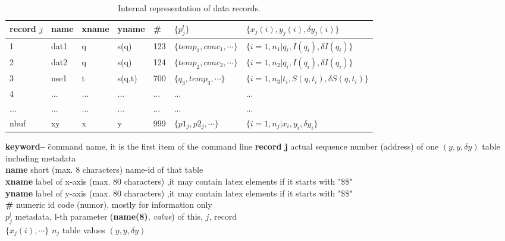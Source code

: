\documentclass[11pt,fleqn]{book} %
\begin{document}
\noindent
\begin{table}[h!]
\footnotesize
    \begin{tabular}{ | l | l | l | l | l | l | l |}
    \hline
     record $j$   & name & xname & yname & \#   & $\{p^l_j\}$ & $\{x_j(i), y_j(i), \delta y_j(i) \} $ \\ \hline\hline
     1      & dat1 & q     & s(q)  & 123  & $\{temp_1, conc_1, \cdots\}$ & $\{ i=1,n_1 | q_i, I(q_i), \delta I(q_i) \}$\\ \hline
     2      & dat2 & q     & s(q)  & 124  & $\{temp_2, conc_2, \cdots\}$ & $\{ i=1,n_2 | q_i, I(q_i), \delta I(q_i) \}$\\ \hline
     3      & nse1 & t     & s(q,t)  & 700  & $\{q_3,temp_3,   \cdots\}$ & $\{ i=1,n_3 | t_i, S(q,t_i), \delta S(q,t_i) \}$\\ \hline
     4      & ...  & ...   & ...  & ... & ...  & ... \\ \hline
     ...    & ...  & ...   & ...  & ... & ...  & ... \\ \hline
     nbuf   & xy   & x     & y    & 999 & $\{p1_j, p2_j, \cdots\}$   & $\{ i=1,n_j | x_i, y_i, \delta y_i \}$ \\ \hline

    \hline
    \end{tabular}
\normalsize
\caption{\label{tab:datastruc}  
Internal representation of data records.}
\end{table}

\begin{tabbing}
\textbf{keyword--}  \= command name, it is the first item of the command line                    \kill
\textbf{record j }  \> actual sequence number (address) of one ${(y,y,\delta y)}$ table including metadata  \\
\textbf{name     }  \> short (max. 8 characters) name-id of that table                                      \\
\textbf{xname    }  \> label of x-axis (max. 80 characters) ,it may contain latex elements if it starts with "\$\$" \\
\textbf{yname    }  \> label of y-axis (max. 80 characters) ,it may contain latex elements if it starts with "\$\$" \\
\textbf{\#       }  \> numeric id code (numor), mostly for information only                                 \\
\textbf{$p_j^l$  }  \> metadata, l-th parameter (\textbf{name(8)}, {\it value}) of this, $j$, record            \\
\textbf{$\{x_j(i),\cdots\}$}  \> $n_j$ table values ${(y,y,\delta y)}$             \\
\end{tabbing}
\end{document}

